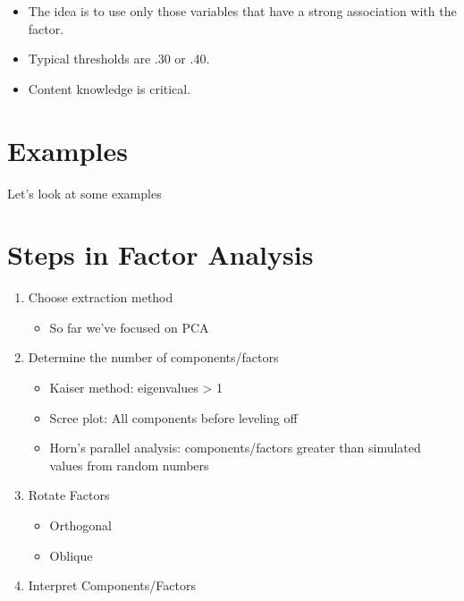 \documentclass[
]{book}
\providecommand{\tightlist}{%
  \setlength{\itemsep}{0pt}\setlength{\parskip}{0pt}}
\begin{document}
\begin{itemize}
\tightlist
\item
  The idea is to use only those variables that have a strong association with the factor.
\item
  Typical thresholds are \textbar.30\textbar{} or \textbar.40\textbar.
\item
  Content knowledge is critical.
\end{itemize}

\hypertarget{examples}{%
\section{Examples}\label{examples}}

Let's look at some examples

\hypertarget{steps-in-factor-analysis}{%
\section{Steps in Factor Analysis}\label{steps-in-factor-analysis}}

\begin{enumerate}
\def\labelenumi{\arabic{enumi}.}
\tightlist
\item
  Choose extraction method

  \begin{itemize}
  \tightlist
  \item
    So far we've focused on PCA
  \end{itemize}
\item
  Determine the number of components/factors

  \begin{itemize}
  \tightlist
  \item
    Kaiser method: eigenvalues \textgreater{} 1
  \item
    Scree plot: All components before leveling off
  \item
    Horn's parallel analysis: components/factors greater than simulated values from random numbers
  \end{itemize}
\item
  Rotate Factors

  \begin{itemize}
  \tightlist
  \item
    Orthogonal
  \item
    Oblique
  \end{itemize}
\item
  Interpret Components/Factors
\end{enumerate}
\end{document}
